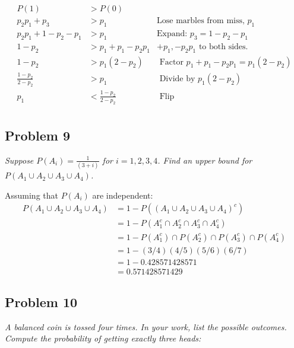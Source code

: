 \documentclass[a4paper,man,natbib]{apa6}
\begin{document}
\begin{align*}
	P(1) &> P(0) &\text{}\\
	p_2p_1 + p_3 &> p_1 &\text{Lose marbles from miss, }p_1\\
	p_2p_1 + 1- p_2 - p_1 &> p_1 &\text{Expand: }p_3 = 1- p_2 - p_1\\
	1-p_2  &> p_1 + p_1 - p_2p_1 & +p_1, -p_2p_1 \text{ to both sides.} \\
	1-p_2  &> p_1(2-p_2) & \text{ Factor } p_1 + p_1 - p_2p_1 = p_1(2-p_2) \\
	\frac{1-p_2}{2-p_2}  &> p_1 & \text{ Divide by } p_1(2-p_2) \\
	p_1  &< \frac{1-p_2}{2-p_2}   & \text{ Flip } \\
\end{align*}

\subsection{Problem 9}
\emph{Suppose $P(A_i )= \frac{1}{(3+i)}$ for $i=1,2,3,4$. 
	Find an upper bound for $P(A_1 \cup A_2 \cup A_3 \cup A_4)$. }\vspace{1em}

Assuming that $P(A_i )$ are independent:
\begin{align*}
	P(A_1 \cup A_2 \cup A_3 \cup A_4)
	&= 1-P((A_1 \cup A_2 \cup A_3 \cup A_4)^c) \\
	&= 1-P(A_1^c \cap A_2^c \cap A_3^c \cap A_4^c) \\
	&= 1-P(A_1^c)\cap P(A_2^c)\cap P(A_3^c) \cap P(A_4^c) \\
	&= 1-(3/4)(4/5)(5/6)(6/7) \\
	&= 1- 0.428571428571 \\
	&= 0.571428571429
\end{align*}

\subsection{Problem 10}
\emph{A balanced coin is tossed four times. In your work, list the possible outcomes. Compute the probability of getting exactly three heads:} \vspace{1em}
\end{document}
